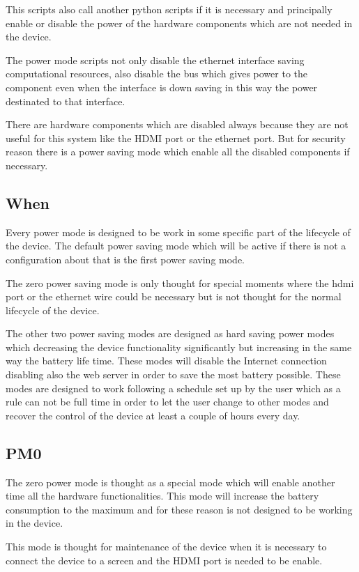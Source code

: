 		This scripts also call another python scripts if it is necessary and principally enable or disable the power of the hardware components which are not needed in the device.

		The power mode scripts not only disable the ethernet interface saving computational resources, also disable the bus which gives power to the component even when the interface is down saving in this way the power destinated to that interface.

		There are hardware components which are disabled always because they are not useful for this system like the HDMI port or the ethernet port. But for security reason there is a power saving mode which enable all the disabled components if necessary.

		\subsection{When}
		Every power mode is designed to be work in some specific part of the lifecycle of the device. The default power saving mode which will be active if there is not a configuration about that is the first power saving mode. 

		The zero power saving mode is only thought for special moments where the hdmi port or the ethernet wire could be necessary but is not thought for the normal lifecycle of the device.

		The other two power saving modes are designed as hard saving power modes which decreasing the device functionality significantly but increasing in the same way the battery life time. These modes will disable the Internet connection disabling also the web server in order to save the most battery possible. These modes are designed to work following a schedule set up by the user which as a rule can not be full time in order to let the user change to other modes and recover the control of the device at least a couple of hours every day.

		\subsection{PM0}\label{sec:pm0}
		The zero power mode is thought as a special mode which will enable another time all the hardware functionalities. This mode will increase the battery consumption to the maximum and for these reason is not designed to be working in the device.

		This mode is thought for maintenance of the device when it is necessary to connect the device to a screen and the HDMI port is needed to be enable.

